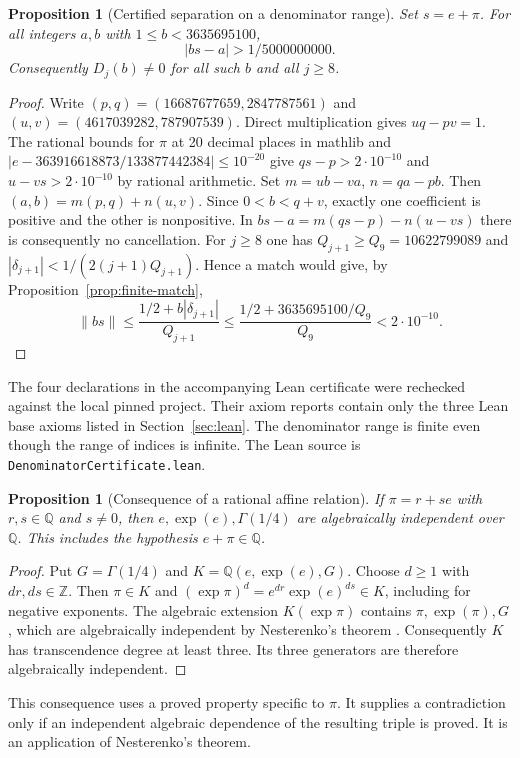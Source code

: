 \documentclass[11pt]{amsart}
\newtheorem{proposition}[theorem]{Proposition}
\theoremstyle{definition}
\theoremstyle{remark}
\numberwithin{equation}{section}
\newcommand{\Q}{\mathbb{Q}}
\newcommand{\Z}{\mathbb{Z}}
\begin{document}
\begin{proposition}[Certified separation on a denominator range]\label{prop:farey-gap}
Set $s=e+\pi$. For all integers $a,b$ with $1\le b<3635695100$,
\[
  |bs-a|>1/5000000000 .
\]
Consequently $D_j(b)\ne0$ for all such $b$ and all $j\ge8$.
\end{proposition}
\begin{proof}
Write $(p,q)=(16687677659,2847787561)$ and
$(u,v)=(4617039282,787907539)$. Direct multiplication gives $uq-pv=1$.
The rational bounds for $\pi$ at 20 decimal places in mathlib and
$|e-363916618873/133877442384|\le10^{-20}$ give
$q s-p>2\cdot10^{-10}$ and $u-vs>2\cdot10^{-10}$ by rational arithmetic.
Set $m=ub-va$, $n=qa-pb$. Then $(a,b)=m(p,q)+n(u,v)$.
Since $0<b<q+v$, exactly one coefficient is positive and the other is
nonpositive. In $bs-a=m(qs-p)-n(u-vs)$ there is consequently no
cancellation. For $j\ge8$ one has $Q_{j+1}\ge Q_9=10622799089$ and
$|\delta_{j+1}|<1/(2(j+1)Q_{j+1})$. Hence a match would give, by
Proposition~\ref{prop:finite-match},
\[
 \|bs\|\le\frac{1/2+b|\delta_{j+1}|}{Q_{j+1}}
 \le\frac{1/2+3635695100/Q_9}{Q_9}<2\cdot10^{-10}.
\]
\end{proof}
The four declarations in the accompanying Lean certificate were rechecked against the local pinned project. Their axiom reports contain only the three Lean base axioms listed in Section~\ref{sec:lean}. The denominator range is finite even though the range of indices is
infinite. The Lean source is \texttt{DenominatorCertificate.lean}.

\begin{proposition}[Consequence of a rational affine relation]\label{prop:nest-transfer}
If $\pi=r+se$ with $r,s\in\Q$ and $s\ne0$, then
$e,\exp(e),\Gamma(1/4)$ are algebraically independent over $\Q$.
This includes the hypothesis $e+\pi\in\Q$.
\end{proposition}
\begin{proof}
Put $G=\Gamma(1/4)$ and $K=\Q(e,\exp(e),G)$. Choose $d\ge1$ with
$dr,ds\in\Z$. Then $\pi\in K$ and
$(\exp\pi)^d=e^{dr}\exp(e)^{ds}\in K$, including for negative exponents.
The algebraic extension $K(\exp\pi)$ contains
$\pi,\exp(\pi),G$, which are algebraically independent by
Nesterenko's theorem \cite{Nesterenko1996}. Consequently $K$ has
transcendence degree at least three. Its three generators are therefore
algebraically independent.
\end{proof}
This consequence uses a proved property specific to $\pi$. It supplies a
contradiction only if an independent algebraic dependence of the resulting
triple is proved. It is an application of Nesterenko's theorem.
\end{document}
